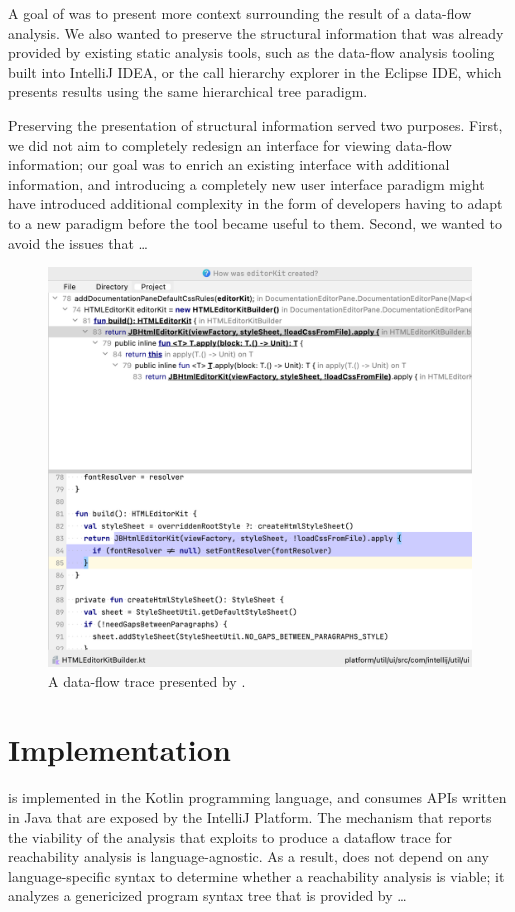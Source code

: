 \noindent A goal of \toolname{} was to present more context surrounding the 
result of a data-flow analysis. 
We also wanted to preserve the structural information that was
already provided by existing static analysis tools, such as the data-flow
analysis tooling built into IntelliJ IDEA, or the call hierarchy explorer in
the Eclipse \ac{IDE}, which presents results using the same hierarchical
tree paradigm.

\par Preserving the presentation of structural information served two purposes.
First, we did not aim to completely redesign an interface for viewing data-flow
information;
our goal was to enrich an existing interface with additional information, and
introducing a completely new user interface paradigm might have introduced
additional complexity in the form of developers having to adapt to a new 
paradigm before the tool became useful to them.
Second, we wanted to avoid the issues that \dots

\begin{figure}[ht]
\centering
\includegraphics[width=\textwidth]{./figs/reach-hover-vis.png}
\caption{
  A data-flow trace presented by \toolname{}. 
}
\label{fig:IntelliJDataflow}
\end{figure}




\section{Implementation}
\label{sec:Impl}

\toolname{} is implemented in the Kotlin programming language, and consumes
\acp{API} written in Java that are exposed by the IntelliJ Platform.
The mechanism that reports the viability of the analysis that \toolname{}
exploits to produce a dataflow trace for reachability analysis is 
language-agnostic.
As a result, \toolname{} does not depend on any language-specific syntax to 
determine whether a reachability analysis is viable; it analyzes a genericized 
program syntax tree that is provided by  \dots

\endinput

